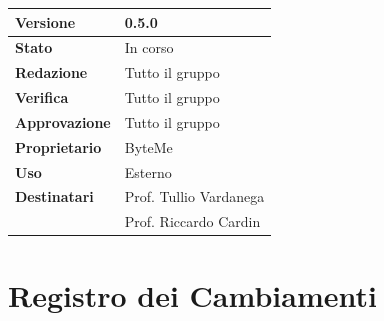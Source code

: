 \documentclass[11pt,a4paper]{article}
\begin{document}
\begin{titlepage}
    \begin{table}[H]
        \centering
        \begin{tabular}{|l|p{5cm}|}
            \hline
            \textbf{Versione} & 0.5.0 \\
            \hline
            \textbf{Stato} & In corso \\
            \hline
            \textbf{Redazione} & Tutto il gruppo \\
            \hline
            \textbf{Verifica} & Tutto il gruppo \\
            \hline
            \textbf{Approvazione} & Tutto il gruppo \\
            \hline
            \textbf{Proprietario} & ByteMe \\
            \hline
            \textbf{Uso} & Esterno \\
            \hline
            \textbf{Destinatari} & Prof. Tullio Vardanega \\ & Prof. Riccardo Cardin \\
            \hline
        \end{tabular}
    \end{table}
    
    \vfill
\end{titlepage}

\thispagestyle{empty}
\section*{Registro dei Cambiamenti}
\end{document}
